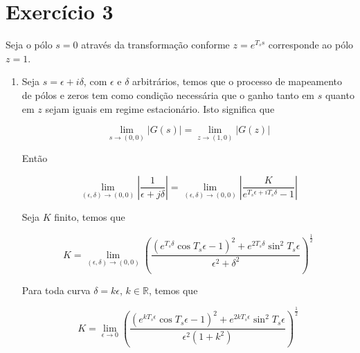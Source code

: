     \section*{Exercício 3}
    \label{ex:3}
    
    Seja o pólo $s=0$ através da transformação conforme $z = e^{T_s s}$ corresponde ao pólo $z = 1$.
    
        \begin{enumerate}
        
        \item %
        \label{item:ex3a}
        
         Seja $s = \epsilon + i \delta$, com $\epsilon$ e $\delta$ arbitrários, temos que o processo de mapeamento de pólos e zeros tem como condição necessária que o ganho tanto em $s$ quanto em $z$ sejam iguais em regime estacionário. Isto significa que
        
            \begin{equation}
                 \lim\limits_{s \rightarrow (0, 0)} \left \lvert G(s) \right \rvert = \lim\limits_{z \rightarrow (1, 0)} \left \lvert G(z) \right \rvert
            \label{eq:limitcond}
            \end{equation}
        
        Então 
        
            \begin{equation}
                \lim\limits_{(\epsilon, \delta) \rightarrow (0, 0)} \left \lvert \frac{1}{\epsilon + j \delta} \right \rvert = \lim\limits_{(\epsilon, \delta) \rightarrow (0, 0)} \left \lvert \frac{K}{e^{T_s \epsilon + i T_s \delta} - 1} \right \rvert
            \end{equation}
        
        Seja $K$ finito, temos que 
        
            \begin{equation*}
                K = \lim\limits_{(\epsilon, \delta) \rightarrow (0, 0)} \left( \frac{(e^{T_s \delta} \cos{T_s \epsilon}  - 1)^2 + e^{2 T_s \delta} \sin^2 T_s \epsilon}{\epsilon^2 + \delta^2} \right)^{\frac{1}{2}}
            \end{equation*}
        
        Para toda curva $\delta = k \epsilon$, $k \in \mathbb{R}$, temos que 
        
            \begin{equation*}
                K = \lim\limits_{\epsilon \rightarrow 0} \left( \frac{(e^{k T_s \epsilon} \cos{T_s \epsilon}  - 1)^2 + e^{2 k T_s \epsilon} \sin^2 T_s \epsilon}{\epsilon^2(1 + k^2)} \right)^{\frac{1}{2}}
            \end{equation*}
        

\end{enumerate}
